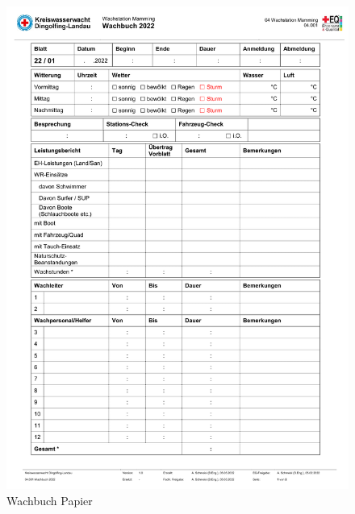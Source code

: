 \documentclass[fontsize=12pt,openright,oneside,paper=a4,BCOR=1cm]{scrbook}
\begin{document}
\begin{appendix}


\begin{figure}[H]
\centering
    \includegraphics[page=2,scale=0.75]{Anlagen/wachbuchPapier.pdf}
  \caption{Wachbuch Papier}
  \label{fig:wachbuchpapier}
\end{figure}


\end{appendix}
\end{document}
